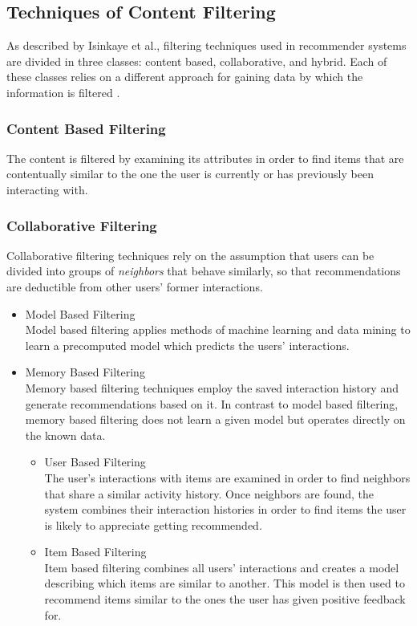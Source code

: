 \newpage

\subsection{Techniques of Content Filtering}
As described by Isinkaye et al., filtering techniques used in recommender systems are divided in three classes: content based, collaborative, and hybrid. Each of these classes relies on a different approach for gaining data by which the information is filtered \cite{Isinkaye2015261}.

\subsubsection{Content Based Filtering}
	The content is filtered by examining its attributes in order to find items that are contentually similar to the one the user is currently or has previously been interacting with.
\subsubsection{Collaborative Filtering}
	Collaborative filtering techniques rely on the assumption that users can be divided into groups of \textit{neighbors} that behave similarly, so that recommendations are deductible from other users' former interactions.
	\begin{itemize}
		\item Model Based Filtering\\
		Model based filtering applies methods of machine learning and data mining to learn a precomputed model which predicts the users' interactions.
		\item Memory Based Filtering\\
		Memory based filtering techniques employ the saved interaction history and generate recommendations based on it. In contrast to model based filtering, memory based filtering does not learn a given model but operates directly on the known data.
		\begin{itemize}
			\item User Based Filtering\\
			The user's interactions with items are examined in order to find neighbors that share a similar activity history. Once neighbors are found, the system combines their interaction histories in order to find items the user is likely to appreciate getting recommended.
			\item Item Based Filtering\\
			Item based filtering combines all users' interactions and creates a model describing which items are similar to another. This model is then used to recommend items similar to the ones the user has given positive feedback for.
		\end{itemize}
	\end{itemize}

